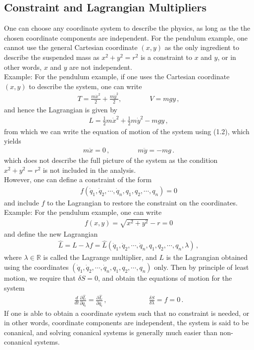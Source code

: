 \documentclass[11pt, onesided]{book}
\theoremstyle{break}
\theoremstyle{break}
\newcommand{\R}{\mathbb{R}}
\newcommand{\pd}{\partial}
\newcommand{\example}{\color{green}Example: \color{black}}
\begin{document}
\subsection{Constraint and Lagrangian Multipliers}
One can choose any coordinate system to describe the physics, as long as the the chosen coordinate components are independent. For the pendulum example, one cannot use the general Cartesian coordinate $(x,y)$ as the only ingredient to describe the suspended mass as $x^2 + y^2 = r^2$ is a constraint to $x$ and $y$, or in other words, $x$ and $y$ are not independent. \\

\example For the pendulum example, if one uses the Cartesian coordinate $(x,y)$ to describe the system, one can write
\begin{align*}
 T = \frac{m\dot{x}^2}{2} + \frac{m\dot{y}^2}{2},\qquad\qquad V = mgy\, ,
\end{align*}
and hence the Lagrangian is given by 
\begin{align*}
L = \frac{1}{2} m\dot{x}^2 + \frac{1}{2}m\dot{y}^2 - mgy\, ,
\end{align*}
from which we can write the equation of motion of the system using (1.2), which yields
\begin{align*}
m \ddot{x} = 0\, , \qquad\qquad m \ddot{y} = -mg\,.
\end{align*}
which does not describe the full picture of the system as the condition $x^2 + y^2 = r^2$ is not included in the analysis. \\

However, one can define a constraint of the form 
\begin{align*}
f(\dot{q}_1,\dot{q}_2,\cdots, \dot{q}_n, q_1,q_2,\cdots, q_n) = 0
\end{align*}
and include $f$ to the Lagrangian to restore the constraint on the coordinates. \\

\example For the pendulum example, one can write
\begin{align*}
f(x,y) = \sqrt{x^2 + y^2} - r = 0
\end{align*}
and define the new Lagrangian 
\begin{align*}
 \hat{L} = L - \lambda f = \hat{L}(\dot{q}_1,\dot{q}_2,\cdots, \dot{q}_n, q_1,q_2,\cdots, q_n, \lambda)\,,
\end{align*}
where $\lambda \in \R$ is called the Lagrange multiplier, and $L$ is the Lagrangian obtained using the coordinates $(\dot{q}_1,\dot{q}_2,\cdots, \dot{q}_n, q_1,q_2,\cdots, q_n)$ only. Then by principle of least motion, we require that $\delta S = 0$, and obtain the equations of motion for the system
\begin{align*}
\frac{d}{dt}\frac{\pd \hat{L}}{\pd \dot{q}_i} = \frac{\pd \hat{L}}{\pd q_i}\,, \qquad\qquad\qquad \frac{\delta S}{\delta \lambda} = f = 0\,.
\end{align*}
If one is able to obtain a coordinate system such that no constraint is needed, or in other words, coordinate components are independent, the system is said to be conanical, and solving conanical systems is generally much easier than non-conanical systems.\\
\end{document}
